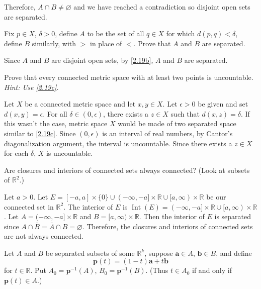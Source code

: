 \begin{exercise}
\begin{exercise}[label = (\alph*), ref = \arabic{exercisei} (\alph*)]
    Therefore, \(A\cap B\neq\varnothing\) and we have reached a contradiction
    so disjoint open sets are separated.
  \item
    \label{2.19c}
    Fix \(p\in X\), \(\delta > 0\), define \(A\) to be the set of all
    \(q\in X\) for which \(d(p, q) < \delta\), define \(B\) similarly, with
    \(>\) in place of \(<\).
    Prove that \(A\) and \(B\) are separated.
    \par\smallskip
    Since \(A\) and \(B\) are disjoint open sets, by \cref{2.19b}, \(A\) and
    \(B\) are separated.
  \item
    Prove that every connected metric space with at least two points is
    uncountable.
    \textit{Hint: Use \cref{2.19c}.}
    \par\smallskip
    Let \(X\) be a connected metric space and let \(x,y\in X\).
    Let \(\epsilon > 0\) be given and set \(d(x,y) = \epsilon\).
    For all \(\delta\in (0, \epsilon)\), there exists a \(z\in X\) such that
    \(d(x,z) = \delta\).
    If this wasn't the case, metric space \(X\) would be made of two separated
    space similar to \cref{2.19c}.
    Since \((0,\epsilon)\) is an interval of real numbers, by Cantor's
    diagonalization argument, the interval is uncountable.
    Since there exists a \(z\in X\) for each \(\delta\), \(X\) is uncountable.
  \end{exercise}
\item
  Are closures and interiors of connected sets always connected?
  (Look at subsets of \(\mathbb{R}^2\).)
  \par\smallskip
  Let \(a > 0\).
  Let \(E = [-a,a]\times\{0\}\cup (-\infty,-a]\times\mathbb{R}\cup
  [a,\infty)\times\mathbb{R}\) be our connected set in \(\mathbb{R}^2\).
  The interior of \(E\) is
  \(\operatorname{Int}(E) = (-\infty,-a]\times\mathbb{R}\cup
  [a,\infty)\times\mathbb{R}\).
  Let \(A = (-\infty,-a]\times\mathbb{R}\) and
  \(B = [a,\infty)\times\mathbb{R}\).
  Then the interior of \(E\) is separated since
  \(A\cap\bar{B} = \bar{A}\cap B = \varnothing\).
  Therefore, the closures and interiors of connected sets are not always
  connected.
\item
  Let \(A\) and \(B\) be separated subsets of some \(\mathbb{R}^k\), suppose
  \(\mathbold{a}\in A\), \(\mathbold{b}\in B\), and define
  \[
  \mathbold{p}(t) = (1 - t)\mathbold{a} + t\mathbold{b}
  \]
  for \(t\in\mathbb{R}\).
  Put \(A_0 = \mathbold{p}^{-1}(A)\), \(B_0 = \mathbold{p}^{-1}(B)\).
  (Thus \(t\in A_0\) if and only if \(\mathbold{p}(t)\in A\).)
  \begin{exercise}[label = (\alph*)]

\end{exercise}
\end{exercise}
